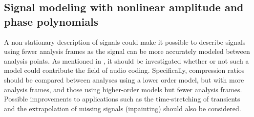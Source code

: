 \subsection{Signal modeling with nonlinear amplitude and phase polynomials}

A non-stationary description of signals could make it possible to describe
signals using fewer analysis frames as the signal can be more accurately modeled
between analysis points. As mentioned in \cite{betser2009sinusoidal}, it should
be investigated whether or not such a model could contribute the field of audio
coding. Specifically, compression ratios should be compared between analyses
using a lower order model, but with more analysis frames, and those using higher-order
models but fewer analysis frames. Possible improvements to applications such as
the time-stretching of transients and the extrapolation of missing signals
(inpainting) should also be considered.
